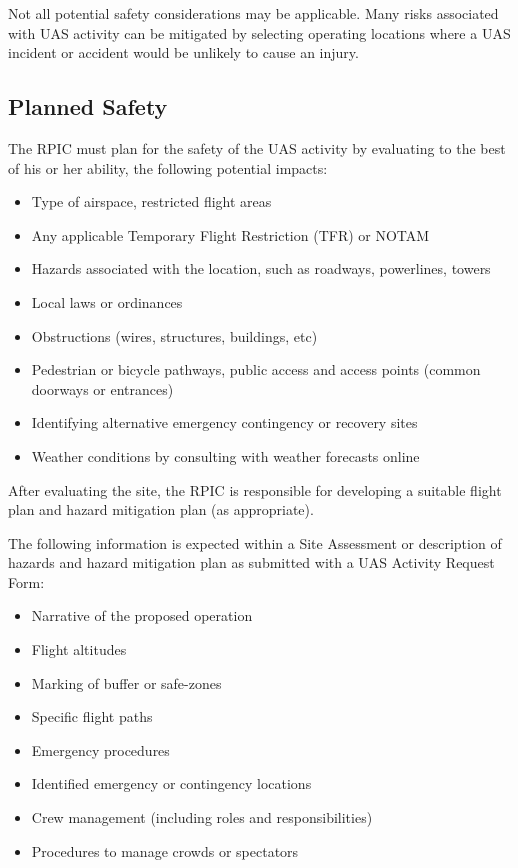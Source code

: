 \documentclass[
]{book}
\providecommand{\tightlist}{%
  \setlength{\itemsep}{0pt}\setlength{\parskip}{0pt}}
\begin{document}
Not all potential safety considerations may be applicable. Many risks associated with UAS activity can be mitigated by selecting operating locations where a UAS incident or accident would be unlikely to cause an injury.

\subsection{Planned Safety}\label{planned-safety}

The RPIC must plan for the safety of the UAS activity by evaluating to the best of his or her ability, the following potential impacts:

\begin{itemize}
\tightlist
\item
  Type of airspace, restricted flight areas
\item
  Any applicable Temporary Flight Restriction (TFR) or NOTAM
\item
  Hazards associated with the location, such as roadways, powerlines, towers
\item
  Local laws or ordinances
\item
  Obstructions (wires, structures, buildings, etc)
\item
  Pedestrian or bicycle pathways, public access and access points (common doorways or entrances)
\item
  Identifying alternative emergency contingency or recovery sites
\item
  Weather conditions by consulting with weather forecasts online
\end{itemize}

After evaluating the site, the RPIC is responsible for developing a suitable flight plan and hazard mitigation plan (as appropriate).

The following information is expected within a Site Assessment or description of hazards and hazard mitigation plan as submitted with a UAS Activity Request Form:

\begin{itemize}
\tightlist
\item
  Narrative of the proposed operation
\item
  Flight altitudes
\item
  Marking of buffer or safe-zones
\item
  Specific flight paths
\item
  Emergency procedures
\item
  Identified emergency or contingency locations
\item
  Crew management (including roles and responsibilities)
\item
  Procedures to manage crowds or spectators
\end{itemize}
\end{document}

